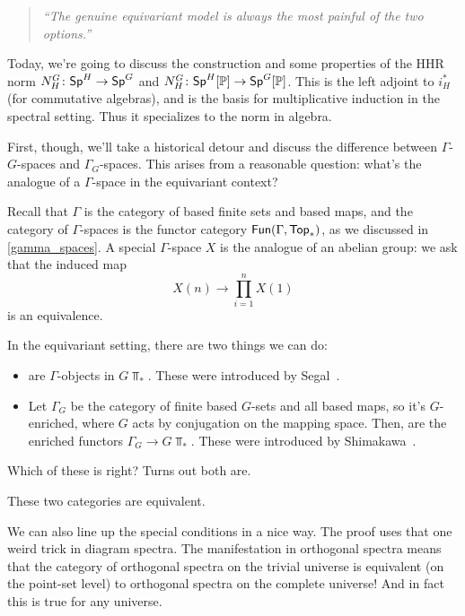 \begin{quote}\textit{
	``The genuine equivariant model is always the most painful of the two options.''
}\end{quote}
Today, we're going to discuss the construction and some properties of the HHR norm $N_H^G\colon \mathsf{Sp}^H\to\mathsf{Sp}^G$
and $N_H^G\colon \mathsf{Sp}^H[\mathbb P]\to\mathsf{Sp}^G[\mathbb P]$. This is the left adjoint to $i_H^*$ (for commutative algebras), and is
the basis for multiplicative induction in the spectral setting. Thus it specializes to the norm in algebra.

First, though, we'll take a historical detour and discuss the difference between $\Gamma$-$G$-spaces and
$\Gamma_G$-spaces. This arises from a reasonable question: what's the analogue of a $\Gamma$-space in the
equivariant context?

Recall that $\Gamma$ is the category of based finite sets and based maps, and the category of $\Gamma$-spaces is
the functor category $\mathsf{Fun}(\Gamma, \mathsf{Top}_*)$, as we discussed in \cref{gamma_spaces}. A special $\Gamma$-space $X$
is the analogue of an abelian group: we ask that the induced map
\[X(n)\longrightarrow\prod_{i=1}^n X(1)\]
is an equivalence.

In the equivariant setting, there are two things we can do:
\begin{itemize}
	\item {} are $\Gamma$-objects in $G\Top_*$. These were introduced by
	Segal~\cite{SegalEquivariant}.
	\item Let $\Gamma_G$ be the category of finite based $G$-sets and all based maps, so it's $G$-enriched, where
	$G$ acts by conjugation on the mapping space. Then,  are the enriched functors
	$\Gamma_G\to G\Top_*$. These were introduced by Shimakawa~\cite{Shi89}.
\end{itemize}
Which of these is right? Turns out both are.
\begin{thm}
These two categories are equivalent.
\end{thm}
We can also line up the special conditions in a nice way. The proof uses that one weird trick in diagram spectra.
The manifestation in orthogonal spectra means that the category of orthogonal spectra on the trivial universe is
equivalent (on the point-set level) to orthogonal spectra on the complete universe! And in fact this is true for
any universe.

